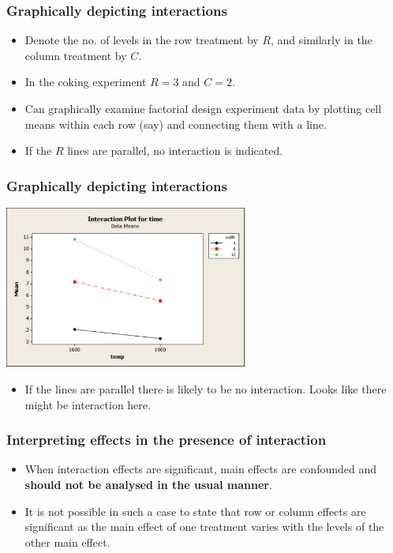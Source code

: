 \documentclass[12pt,xcolor=dvipsnames,handout,mathserif,aspectratio=169]{beamer}
\begin{document}
\begin{frame}
\frametitle{Graphically depicting interactions}
\begin{itemize}
\item Denote the no. of levels in the row treatment by $R$, and similarly in the column treatment by $C$.
\vspace{0.2cm}
\item In the coking experiment $R=3$ and $C=2$.
\vspace{0.2cm}
\item Can graphically examine factorial design experiment data by plotting cell means within each row (say) and connecting them with a line.
\vspace{0.2cm}
\item If the $R$ lines are parallel, no interaction is indicated.
\end{itemize}
\end{frame}

\begin{frame}
\frametitle{Graphically depicting interactions}
\begin{center}
\includegraphics[width=8cm]{Interaction.pdf}
\end{center}
\begin{itemize}
\item If the lines are parallel there is likely to be no interaction. Looks like there might be interaction here.
\end{itemize}
\end{frame}

\begin{frame}
\frametitle{Interpreting effects in the presence of interaction}
\begin{itemize}
\item When interaction effects are significant, main effects are confounded and \textbf{should not be analysed in the usual manner}.
\vspace{0.2cm}
\item It is not possible in such a case to state that row or column effects are significant as the main effect of one treatment varies with the levels of the other main effect.
\end{itemize}
\end{frame}
\end{document}
